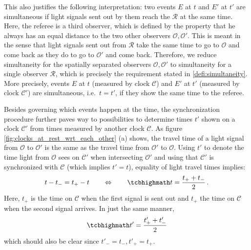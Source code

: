 This also justifies the following interpretation: two events $E$ at $t$ and $E'$ at $t'$ are simultaneous if light signals sent out by them reach the  $\mathcal{R}$ at the same time. Here, the referee is a third observer, which is defined by the property that he always has an equal distance to the two other observers $\mathcal{O}, \mathcal{O}'$. This is meant in the sense that light signals sent out from $\mathcal{R}$ take the same time to go to $\mathcal{O}$ and come back as they do to go to $\mathcal{O}'$ and come back. Therefore, we reduce simultaneity for the spatially separated observers $\mathcal{O}, \mathcal{O}'$ to simultaneity for a single observer $\mathcal{R}$, which is precisely the requirement stated in \ref{defi:simultaneity}. More precisely, events $E$ at $t$ (measured by clock $\mathcal{C}$) and $E'$ at $t'$ (measured by clock $\mathcal{C}'$) are simultaneous, i.e.~$t = t'$, if they show the same time to the referee.


Besides governing which events happen at the time, the synchronization procedure further paves way to possibilities to determine times $t'$ shown on a clock $\mathcal{C}'$ from times measured by another clock $\mathcal{C}$. As figure \ref{fig:clocks_at_rest_wrt_each_other} (a) shows, the travel time of a light signal from $\mathcal{O}$ to $\mathcal{O}'$ is the same as the travel time from $\mathcal{O}'$ to $\mathcal{O}$. Using $t'$ to denote the time light from $\mathcal{O}$ sees on $\mathcal{C}'$ when intersecting $\mathcal{O}'$ and using that $\mathcal{C}'$ is synchronized with $\mathcal{C}$ (which implies $t' = t$), equality of light travel times implies:
\begin{equation}\label{eq:time_synchr}
t - t_- = t_+ - t
\qquad \Leftrightarrow \qquad
\eqbox{
t = \frac{t_+ + t_-}{2}
} \, .
\end{equation}
Here, $t_+$ is the time on $\mathcal{C}$ when the first signal is sent out and $t_+$ the time on $\mathcal{C}$ when the second signal arrives. In just the same manner,
\begin{equation}\label{eq:time_synchr_primed}
\eqbox{
t' = \frac{t'_+ + t'_-}{2}
}
\end{equation}
which should also be clear since $t'_- = t_-, t'_+ = t_+$.\\


